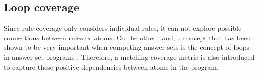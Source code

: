 \subsection{Loop coverage}
\label{subsec:Coverage metrics/Branch-like coverage/Loop coverage}
Since rule coverage only considers individual rules, it can not explore possible connections between rules or atoms. On the other hand, a concept that has been shown to be very important when computing answer sets is the concept of loops in answer set programs \cite{LZ04}. Therefore, a matching coverage metric is also introduced to capture these positive dependencies between atoms in the program.

